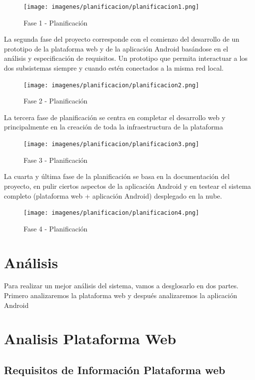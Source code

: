 \documentclass[a4paper,11pt]{book}
\begin{document}
\begin{figure}[H] 
\centering 
\texttt{[image: imagenes/planificacion/planificacion1.png]}
\caption{ Fase 1 - Planificación\cite{propio}  }  
\end{figure}

La segunda fase del proyecto corresponde con el comienzo del desarrollo de un prototipo de la plataforma web y de la aplicación Android basándose en el análisis y especificación de requisitos. Un prototipo que permita interactuar a los dos subsistemas siempre y cuando estén conectados a la misma red local.

\begin{figure}[H] 
\centering 
\texttt{[image: imagenes/planificacion/planificacion2.png]}
\caption{ Fase 2 - Planificación\cite{propio}  }  
\end{figure}

La tercera fase de planificación se centra en completar el desarrollo web y principalmente en la creación de toda la infraestructura de la plataforma

\begin{figure}[H] 
\centering 
\texttt{[image: imagenes/planificacion/planificacion3.png]}
\caption{ Fase 3 - Planificación\cite{propio}  }  
\end{figure}

La cuarta y última fase de la planificación se basa en la documentación del proyecto, en pulir ciertos aspectos de la aplicación Android y en testear el sistema completo (plataforma web + aplicación Android) desplegado en la nube. 

\begin{figure}[H] 
\centering 
\texttt{[image: imagenes/planificacion/planificacion4.png]}
\caption{ Fase 4 - Planificación\cite{propio}  }  
\end{figure}



\section{Análisis}
Para realizar un mejor análisis del sistema, vamos a desglosarlo en dos partes. Primero analizaremos la plataforma web y después analizaremos la aplicación Android 

\section{Analisis Plataforma Web}
\subsection{Requisitos de Información Plataforma web}
\end{document}
